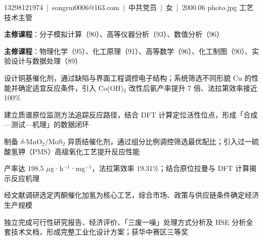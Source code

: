 

%
  {13298121974~|~songrui0006@163.com~|~中共党员~|~女~|~2000.06}%
  {photo.jpg}%
  {工艺技术主管}


\begin{bullets}
  \item \textbf{主修课程}：分子模拟计算（90）、高等仪器分析（93）、数值分析（96）
\end{bullets}

\begin{bullets}
  \item \textbf{主修课程}：物理化学（95）、化工原理（91）、高等数学（96）、化工制图（90）、实验设计与数据处理（89）
\end{bullets}


\begin{bullets}
  \item 设计铜基催化剂，通过缺陷与界面工程调控电子结构；系统筛选不同形貌 Cu 的性能并确定适宜反应条件，引入 Co(OH)$_2$ 改性后氨产率提升 7 倍、法拉第效率接近 100\%
  \item 建立质谱原位监测方法追踪反应路径，结合 DFT 计算定位活性位点，形成「合成—测试—机理」的数据闭环
\end{bullets}

\begin{bullets}
  \item 制备 $\delta$-MnO$_2$/MoS$_2$ 异质结催化剂，通过组分比例调控筛选最优配比；引入过一硫酸氢钾（PMS）高级氧化工艺提升反应性能
  \item 产率达 198.5 $\mu$g·h$^{-1}$·mg$^{-1}$，法拉第效率 19.31\%；结合原位拉曼与 DFT 计算揭示反应机理
\end{bullets}


\begin{bullets}
  \item 经文献调研选定丙酮催化加氢为核心工艺，综合市场、政策与供应链条件确定经济生产规模
  \item 独立完成可行性研究报告、经济评价、「三废一噪」处理方式分析及 HSE 分析全套技术文档，形成完整工业化设计方案；获华中赛区三等奖
\end{bullets}

